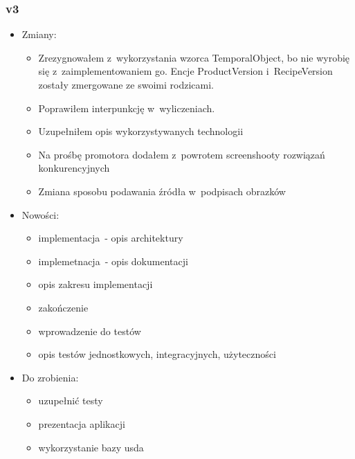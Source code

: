 \subsubsection{v3}
\begin{itemize}
\item Zmiany:
    \begin{itemize}
    	\item Zrezygnowałem z~wykorzystania wzorca TemporalObject, bo nie wyrobię się z~zaimplementowaniem go. Encje ProductVersion i~RecipeVersion zostały zmergowane ze swoimi rodzicami.
		\item Poprawiłem interpunkcję w~wyliczeniach.
		\item Uzupełniłem opis wykorzystywanych technologii
		\item Na prośbę promotora dodałem z~powrotem screenshooty rozwiązań konkurencyjnych
		\item Zmiana sposobu podawania źródła w~podpisach obrazków
	\end{itemize}
\item Nowości:
    \begin{itemize}
		\item implementacja~- opis architektury
		\item implemetnacja~- opis dokumentacji
		\item opis zakresu implementacji
		\item zakończenie
		\item wprowadzenie do testów
		\item opis testów jednostkowych, integracyjnych, użyteczności
	\end{itemize}
\item Do zrobienia:
    \begin{itemize}
        \item uzupełnić testy
        \item prezentacja aplikacji
        \item wykorzystanie bazy usda
	\end{itemize}
\end{itemize}

